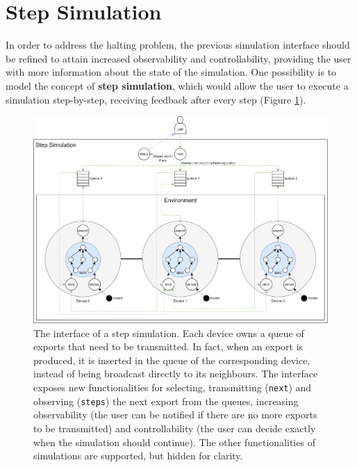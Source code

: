 
\section{Step Simulation}
\label{section:design:step-simulation}

In order to address the halting problem, the previous simulation interface
should be refined to attain increased observability and controllability,
providing the user with more information about the state of the simulation. One
possibility is to model the concept of \textbf{step simulation}, which would
allow the user to execute a simulation step-by-step, receiving feedback after
every step (Figure \ref{figure:step-simulation}).

\begin{figure}[!ht]
  \centering
  \includegraphics[width=1\textwidth]{resources/figures/step-simulation.png}
  \caption{The interface of a step simulation. Each device owns a queue of
    exports that need to be transmitted. In fact, when an export is produced, it
    is inserted in the queue of the corresponding device, instead of being
    broadcast directly to its neighbours. The interface exposes new
    functionalities for selecting, transmitting (\texttt{next}) and observing
    (\texttt{steps}) the next export from the queues, increasing observability
    (the user can be notified if there are no more exports to be transmitted)
    and controllability (the user can decide exactly when the simulation should
    continue). The other functionalities of simulations are supported, but
    hidden for clarity.}
  \label{figure:step-simulation}
\end{figure}

